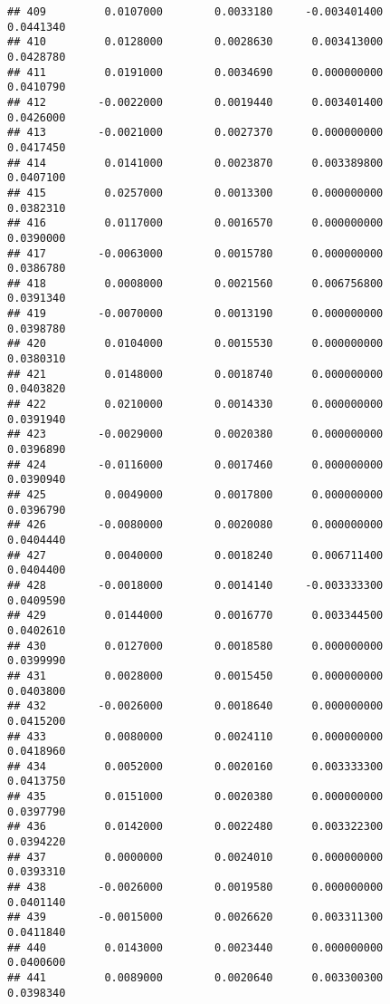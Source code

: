 \documentclass[
]{article}
\begin{document}
\begin{verbatim}
## 409         0.0107000        0.0033180     -0.003401400             0.0441340
## 410         0.0128000        0.0028630      0.003413000             0.0428780
## 411         0.0191000        0.0034690      0.000000000             0.0410790
## 412        -0.0022000        0.0019440      0.003401400             0.0426000
## 413        -0.0021000        0.0027370      0.000000000             0.0417450
## 414         0.0141000        0.0023870      0.003389800             0.0407100
## 415         0.0257000        0.0013300      0.000000000             0.0382310
## 416         0.0117000        0.0016570      0.000000000             0.0390000
## 417        -0.0063000        0.0015780      0.000000000             0.0386780
## 418         0.0008000        0.0021560      0.006756800             0.0391340
## 419        -0.0070000        0.0013190      0.000000000             0.0398780
## 420         0.0104000        0.0015530      0.000000000             0.0380310
## 421         0.0148000        0.0018740      0.000000000             0.0403820
## 422         0.0210000        0.0014330      0.000000000             0.0391940
## 423        -0.0029000        0.0020380      0.000000000             0.0396890
## 424        -0.0116000        0.0017460      0.000000000             0.0390940
## 425         0.0049000        0.0017800      0.000000000             0.0396790
## 426        -0.0080000        0.0020080      0.000000000             0.0404440
## 427         0.0040000        0.0018240      0.006711400             0.0404400
## 428        -0.0018000        0.0014140     -0.003333300             0.0409590
## 429         0.0144000        0.0016770      0.003344500             0.0402610
## 430         0.0127000        0.0018580      0.000000000             0.0399990
## 431         0.0028000        0.0015450      0.000000000             0.0403800
## 432        -0.0026000        0.0018640      0.000000000             0.0415200
## 433         0.0080000        0.0024110      0.000000000             0.0418960
## 434         0.0052000        0.0020160      0.003333300             0.0413750
## 435         0.0151000        0.0020380      0.000000000             0.0397790
## 436         0.0142000        0.0022480      0.003322300             0.0394220
## 437         0.0000000        0.0024010      0.000000000             0.0393310
## 438        -0.0026000        0.0019580      0.000000000             0.0401140
## 439        -0.0015000        0.0026620      0.003311300             0.0411840
## 440         0.0143000        0.0023440      0.000000000             0.0400600
## 441         0.0089000        0.0020640      0.003300300             0.0398340

\end{verbatim}
\end{document}
